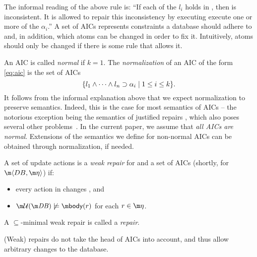 The informal reading of the above rule is: ``If each of the $l_i$ holds in \db, then \db is inconsistent. 
It is allowed to repair this inconsistency by executing execute one or more of the $\alpha_i$.''
A set of AICs represents constraints a database should adhere to and, in addition, which atoms can be changed in order to fix it. Intuitively, atoms should only be changed if there is some rule that allows it. 


An AIC is called \emph{normal} if $k=1$. The \emph{normalization} of an AIC of the form \eqref{eq:aic} is the set of AICs 
\[\{l_1\land \dots\land l_n\supset \alpha_i\mid 1\leq i\leq k\}.\]
It follows from the informal explanation above that we expect normalization to preserve semantics. Indeed, this is the case for most semantics of AICs -- the notorious exception being the semantics of justified repairs \cite{tplp/CaropreseT11}, which also poses several other problems~\cite{tase/Cruz-FilipeEGN13}.
In the current paper, we assume that \emph{all AICs are normal}. Extensions of the semantics we define for non-normal AICs can be obtained through normalization, if needed.

\begin{definition}
 A set of update actions \UU is a \emph{weak repair} for \db and a set \aics of AICs (shortly, for $\fulldb$) if:
 \begin{itemize}
  \item every action in \UU changes \db, and 
  \item $\UU(\db)\not\models \body(r)$ for each $r\in\aics$.
 \end{itemize}
A $\subseteq$-minimal weak repair is called a \emph{repair}.
\end{definition}

(Weak) repairs do not take the head of AICs into account, and thus allow arbitrary changes to the database.

